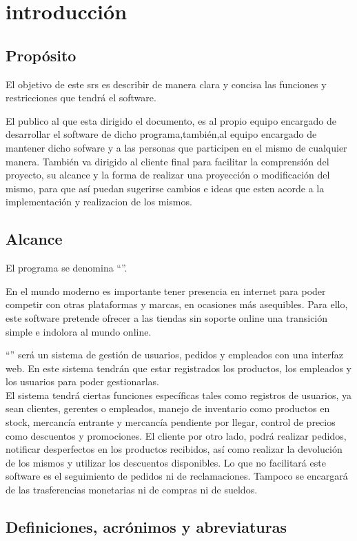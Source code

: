 \section{introducción}
\subsection{Propósito}
El objetivo de este \gls{srs} es describir de manera clara y concisa las funciones y restricciones que tendrá el software.

El publico al que esta dirigido el documento, es al propio equipo encargado de desarrollar el software de dicho programa,también,al equipo encargado de mantener dicho sofware y a las personas que participen en el mismo de cualquier manera. También va dirigido al cliente final para facilitar la comprensión del proyecto, su alcance y la forma de realizar una proyección o modificación del mismo, para que así puedan sugerirse cambios e ideas que esten acorde a la implementación y realizacion de los mismos. 
\subsection{Alcance}
El programa se denomina ``\nombredelproyecto''.

En el mundo moderno es importante tener presencia en internet para poder competir con otras plataformas y marcas, en ocasiones más asequibles. Para ello, este software pretende ofrecer a las tiendas sin soporte online una transición simple e indolora al mundo online.

``\nombredelproyecto'' será un sistema de gestión de usuarios, pedidos y empleados con una interfaz web. En este sistema tendrán que estar registrados los productos, los empleados y los usuarios para poder gestionarlas.\\
El sistema tendrá ciertas funciones específicas tales como registros de usuarios, ya sean clientes, gerentes o empleados, manejo de inventario como productos en stock, mercancía entrante y mercancía pendiente por llegar, control de precios como descuentos y promociones. El cliente por otro lado, podrá realizar pedidos, notificar desperfectos en los productos recibidos, así como realizar la devolución de los mismos y utilizar los descuentos disponibles.
Lo que no facilitará este software es el seguimiento de pedidos ni de reclamaciones. Tampoco se encargará de las trasferencias monetarias ni de compras ni de sueldos.

\glsaddall
\nocite{*}
\subsection{Definiciones, acrónimos y abreviaturas}
{
	\printglossary}


